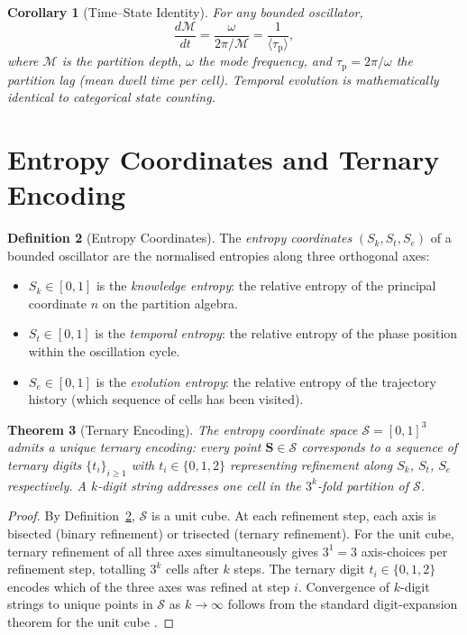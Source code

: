 \documentclass[twocolumn,11pt,a4paper]{article}
\theoremstyle{thmstyle}
\newtheorem{theorem}{Theorem}[section]
\newtheorem{corollary}[theorem]{Corollary}
\theoremstyle{axiomstyle}
\theoremstyle{definition}
\newtheorem{definition}[theorem]{Definition}
\theoremstyle{remark}
\newcommand{\Sk}{S_{k}}
\newcommand{\St}{S_{t}}
\newcommand{\Se}{S_{e}}
\newcommand{\Sspace}{\mathcal{S}}
\newcommand{\Depth}{\mathcal{M}}
\newcommand{\Lag}{\tau_{\mathrm{p}}}
\begin{document}
\begin{corollary}[Time--State Identity]\label{cor:timestate}
For any bounded oscillator,
\begin{equation}
\frac{d\Depth}{dt}=\frac{\omega}{2\pi/\Depth}=\frac{1}{\langle\Lag\rangle},
\end{equation}
where $\Depth$ is the partition depth, $\omega$ the mode frequency, and $\Lag=2\pi/\omega$ the partition lag (mean dwell time per cell). Temporal evolution is mathematically identical to categorical state counting.
\end{corollary}

\section{Entropy Coordinates and Ternary Encoding}
\label{sec:entropy}

\begin{definition}[Entropy Coordinates]\label{def:scoords}
The \emph{entropy coordinates} $(\Sk,\St,\Se)$ of a bounded oscillator are the normalised entropies along three orthogonal axes:
\begin{itemize}[nosep]
\item $\Sk\in[0,1]$ is the \emph{knowledge entropy}: the relative entropy of the principal coordinate $n$ on the partition algebra.
\item $\St\in[0,1]$ is the \emph{temporal entropy}: the relative entropy of the phase position within the oscillation cycle.
\item $\Se\in[0,1]$ is the \emph{evolution entropy}: the relative entropy of the trajectory history (which sequence of cells has been visited).
\end{itemize}
\end{definition}

\begin{theorem}[Ternary Encoding]\label{thm:ternary}
The entropy coordinate space $\Sspace=[0,1]^{3}$ admits a unique ternary encoding: every point $\bm{S}\in\Sspace$ corresponds to a sequence of ternary digits $\{t_{i}\}_{i\geq 1}$ with $t_{i}\in\{0,1,2\}$ representing refinement along $\Sk$, $\St$, $\Se$ respectively. A $k$-digit string addresses one cell in the $3^{k}$-fold partition of $\Sspace$.
\end{theorem}

\begin{proof}
By Definition~\ref{def:scoords}, $\Sspace$ is a unit cube. At each refinement step, each axis is bisected (binary refinement) or trisected (ternary refinement). For the unit cube, ternary refinement of all three axes simultaneously gives $3^{1}=3$ axis-choices per refinement step, totalling $3^{k}$ cells after $k$ steps. The ternary digit $t_{i}\in\{0,1,2\}$ encodes which of the three axes was refined at step $i$. Convergence of $k$-digit strings to unique points in $\Sspace$ as $k\to\infty$ follows from the standard digit-expansion theorem for the unit cube \citep{rudin1987}.
\end{proof}
\end{document}
